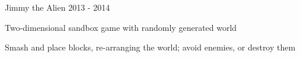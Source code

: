 \begin{cventries}
  \cvproj
    {} %
    {Jimmy the Alien} %
    {} %
    {2013 - 2014} %
    {
      \begin{cvitems} %
        \item {Two-dimensional sandbox game with randomly generated world}
        \item {Smash and place blocks, re-arranging the world; avoid
            enemies, or destroy them}
      \end{cvitems}
    }

\end{cventries}
